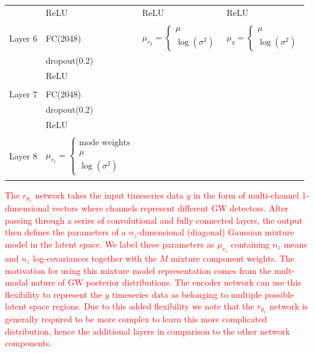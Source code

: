 \documentclass[%
showpacs,
nofootinbib,
 amsmath,amssymb,
 aps,
 twocolumn,
 prl,
 reprint,
floatfix,
]{revtex4-1}
\newcommand{\new}[1]{\textcolor{red}{#1}}
\begin{document}
\begin{table}
\begin{tabularx}{\textwidth}{|X|X|X|X|}
 & ReLU & ReLU & ReLU \\
 & & & \\
 \hline
Layer 6 & FC(2048) & $\mu_{r_2}=\left\{\begin{array}{c}
\mu \\
\log(\sigma^2) \end{array}\right.$ & $\mu_{q}=\left\{\begin{array}{c}
\mu \\
\log(\sigma^2) \end{array}\right.$ \\
& dropout(0.2) & & \\
& ReLU &  &  \\
& & & \\
\hline
Layer 7 & FC(2048) & & \\
& dropout(0.2) & & \\
& ReLU & & \\
& & & \\
\hline
Layer 8 & $\mu_{r_1}=\left\{\begin{array}{c}
\text{mode weights} \\
\mu \\
\log(\sigma^2) \end{array}\right.$ & & \\
\botrule
\end{tabularx}
\label{Tab:network_design}
\end{table}  

%
%
\new{The $r_{\theta_1}$ network takes the input timeseries data $y$ in the form of
multi-channel 1-dimensional vectors where channels represent different \ac{GW}
detectors. After passing through a series of convolutional and fully connected
layers, the output then defines the parameters of a $n_z$-dimensional
(diagonal) Gaussian mixture model in the latent space. We label these
parameters as $\mu_{r_1}$ containing $n_z$ means and $n_z$ log-covariances
together with the $M$ mixture component weights. The motivation for using this
mixture model representation comes from the mult-modal nature of \ac{GW}
posterior distributions. The encoder network can use this flexibility to
represent the $y$ timeseries data as belonging to multiple possible latent
space regions. Due to this added flexibility we note that the $r_{\theta_1}$
network is generally required to be more complex to learn this more complicated
distribution, hence the additional layers in comparison to the other network
components.}   
\end{document}
